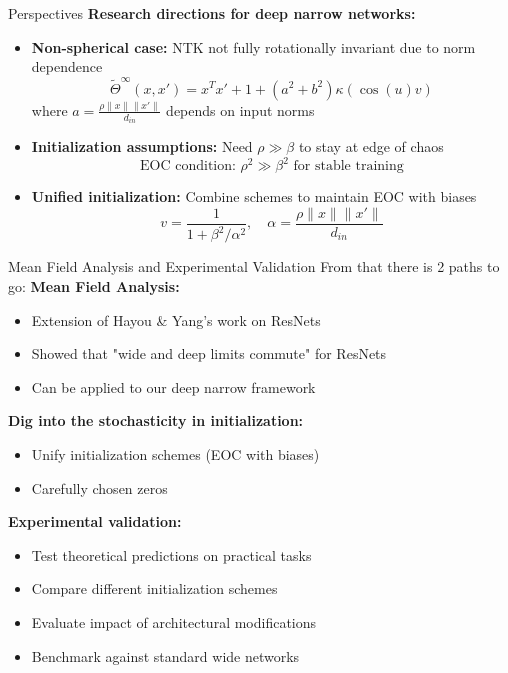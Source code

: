 \documentclass{beamer}
\begin{document}
\begin{frame}{Perspectives}
\textbf{Research directions for deep narrow networks:}
\begin{itemize}
\item \textbf{Non-spherical case:} NTK not fully rotationally invariant due to norm dependence
\[ \tilde{\Theta}^\infty(x, x') = x^T x' + 1 + (a^2 + b^2)\kappa(\cos(u)v) \]
where $a = \frac{\rho\|x\|\|x'\|}{d_{in}}$ depends on input norms

\item \textbf{Initialization assumptions:} Need $\rho \gg \beta$ to stay at edge of chaos
\[ \text{EOC condition: } \rho^2 \gg \beta^2 \text{ for stable training} \]

\item \textbf{Unified initialization:} Combine schemes to maintain EOC with biases
\[ v = \frac{1}{1 + \beta^2/\alpha^2}, \quad \alpha = \frac{\rho\|x\|\|x'\|}{d_{in}} \]

\end{itemize}
\end{frame}



\begin{frame}{Mean Field Analysis and Experimental Validation}
    From that there is 2 paths to go:
\textbf{Mean Field Analysis:}
\begin{itemize}
\item Extension of Hayou \& Yang's work on ResNets
\item Showed that "wide and deep limits commute" for ResNets
\item Can be applied to our deep narrow framework
\end{itemize}


\textbf{Dig into the stochasticity in initialization:}
\begin{itemize}
\item Unify initialization schemes (EOC with biases)
\item Carefully chosen zeros
\end{itemize}

\textbf{Experimental validation:}
\begin{itemize}
\item Test theoretical predictions on practical tasks
\item Compare different initialization schemes
\item Evaluate impact of architectural modifications
\item Benchmark against standard wide networks
\end{itemize}
\end{frame}
\end{document}
